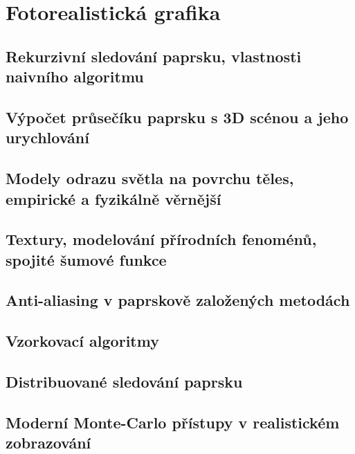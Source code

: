 \documentclass[../../main.tex]{subfiles}
\begin{document}
\section{Fotorealistická grafika}

\subsection{Rekurzivní sledování paprsku, vlastnosti naivního algoritmu}
\subsection{Výpočet průsečíku paprsku s 3D scénou a jeho urychlování}
\subsection{Modely odrazu světla na povrchu těles, empirické a fyzikálně věrnější}
\subsection{Textury, modelování přírodních fenoménů, spojité šumové funkce}
\subsection{Anti-aliasing v paprskově založených metodách}
\subsection{Vzorkovací algoritmy}
\subsection{Distribuované sledování paprsku}
\subsection{Moderní Monte-Carlo přístupy v realistickém zobrazování}
\end{document}
